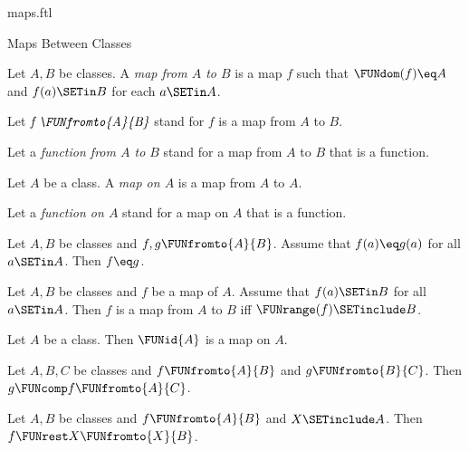\documentclass{naproche-library}
\begin{document}
\begin{smodule}[title=Maps]{maps.ftl}
\begin{sfragment}{Maps Between Classes}
  \begin{definition}[forthel,id=FOUNDATIONS_06_2823507398361088]
    Let $A, B$ be classes.
    A \emph{map from $A$ to $B$} is a map $f$ such that $\FUNdom(f) \eq A$ and $f(a) \SETin B$ for each $a \SETin A$.

    Let $\emph{f \FUNfromto{A}{B}}$ stand for $f$ is a map from $A$ to $B$.

    Let a \emph{function from $A$ to $B$} stand for a map from $A$ to $B$ that is a function.
  \end{definition}

  \begin{definition}[forthel,id=FOUNDATIONS_06_3390734908522496]
    Let $A$ be a class.
    A \emph{map on $A$} is a map from $A$ to $A$.

    Let a \emph{function on $A$} stand for a map on $A$ that is a function.
  \end{definition}

  \begin{proposition}[forthel,id=FOUNDATIONS_06_3312973569327104]
    Let $A, B$ be classes and $f, g \FUNfromto{A}{B}$.
    Assume that $f(a) \eq g(a)$ for all $a \SETin A$.
    Then $f \eq g$.
  \end{proposition}

  \begin{proposition}
    Let $A, B$ be classes and $f$ be a map of $A$.
    Assume that $f(a) \SETin B$ for all $a \SETin A$.
    Then $f$ is a map from $A$ to $B$ iff $\FUNrange(f) \SETinclude B$.
  \end{proposition}

  \begin{proposition}[forthel,id=FOUNDATIONS_06_5104361690628096]
    Let $A$ be a class.
    Then $\FUNid{A}$ is a map on $A$.
  \end{proposition}

  \begin{proposition}[forthel,id=FOUNDATIONS_06_1706446651654144]
    Let $A, B, C$ be classes and $f \FUNfromto{A}{B}$ and $g \FUNfromto{B}{C}$.
    Then $g \FUNcomp f \FUNfromto{A}{C}$.
  \end{proposition}

  \begin{proposition}[forthel,id=FOUNDATIONS_06_4078561256275968]
    Let $A, B$ be classes and $f \FUNfromto{A}{B}$ and $X \SETinclude A$.
    Then $f \FUNrest X \FUNfromto{X}{B}$.
  \end{proposition}


\end{sfragment}
\end{smodule}
\end{document}
